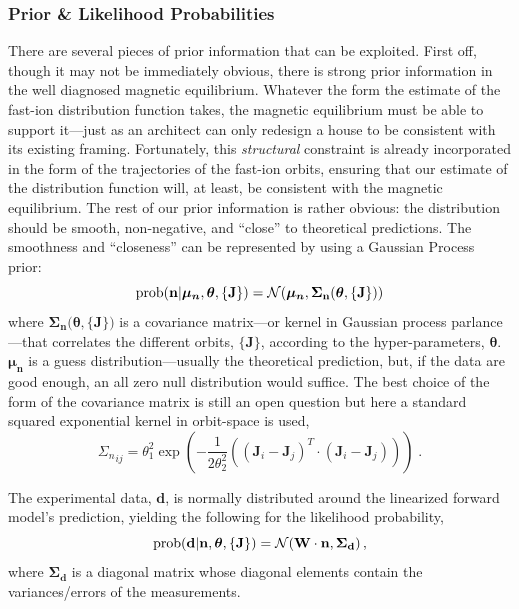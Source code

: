 \subsubsection{Prior \& Likelihood Probabilities}
There are several pieces of prior information that can be exploited.
First off, though it may not be immediately obvious, there is strong prior information in the well diagnosed magnetic equilibrium.
Whatever the form the estimate of the fast-ion distribution function takes, the magnetic equilibrium must be able to support it---just as an architect can only redesign a house to be consistent with its existing framing.
Fortunately, this \textit{structural} constraint is already incorporated in the form of the trajectories of the fast-ion orbits, ensuring that our estimate of the distribution function will, at least, be consistent with the magnetic equilibrium.  
The rest of our prior information is rather obvious: the distribution should be smooth, non-negative, and ``close'' to  theoretical predictions. The smoothness and ``closeness'' can be represented by using a Gaussian Process prior:
\begin{equation}\label{eq:prior}
    \rm{prob}(\mathbf{n}|\boldsymbol{\mu_n},\boldsymbol{\theta},\{\mathbf{J}\})  =
    \mathcal{N}(\boldsymbol{\mu_n},\mathbf{\Sigma_n(\boldsymbol{\theta},\{\mathbf{J}\}}))
\end{equation}
where $\mathbf{\Sigma_n(\boldsymbol{\theta},\{\mathbf{J}\}})$ is a covariance matrix---or kernel in Gaussian process parlance---that correlates the different orbits, $\{\mathbf{J}\}$, according to the hyper-parameters, $\boldsymbol{\theta}$. $\boldsymbol{\mu_n}$ is a guess distribution---usually the theoretical prediction, but, if the data are good enough, an all zero null distribution would suffice.
The best choice of the form of the covariance matrix is still an open question but here a standard squared exponential kernel in orbit-space is used, 
\begin{equation}\label{eq:kernel}
    {\Sigma_n}_{ij} = \theta_1^2 \exp \left (-\frac{1}{2\theta_2^2}\left ( (\mathbf{J}_i - \mathbf{J}_j)^T\cdot (\mathbf{J}_i - \mathbf{J}_j)\right ) \right ) \;.
\end{equation}

The experimental data, $\mathbf{d}$, is normally distributed around the linearized forward model's prediction, yielding the following for the likelihood probability,
\begin{equation}\label{eq:likelihood}
    \rm{prob}(\mathbf{d}|\mathbf{n},\boldsymbol{\theta},\{\mathbf{J}\}) = \mathcal{N}(\mathbf{W}\cdot\mathbf{n},\mathbf{\Sigma_d}) \,,
\end{equation}
where $\mathbf{\Sigma_d}$ is a diagonal matrix whose diagonal elements contain the variances/errors of the measurements.

